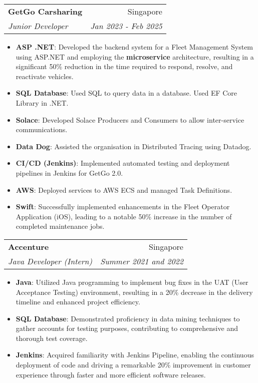 \documentclass[letterpaper,11pt]{article}
\makeatletter
\newcommand{\resumeItem}[2]{
  \item\small{
    \textbf{#1}{: #2 \vspace{-2pt}}
  }
}
\newcommand{\resumeSubheading}[4]{
  \vspace{-1pt}\item
    \begin{tabular*}{0.97\textwidth}[t]{l@{\extracolsep{\fill}}r}
      \textbf{#1} & #2 \\
      \textit{\small#3} & \textit{\small #4} \\
    \end{tabular*}\vspace{-5pt}
}
\newcommand{\resumeSubSubheading}[2]{
    \begin{tabular*}{0.97\textwidth}{l@{\extracolsep{\fill}}r}
      \textit{\small#1} & \textit{\small #2} \\
    \end{tabular*}\vspace{-5pt}
}
\newcommand{\resumeSubHeadingListEnd}{\end{itemize}}
\newcommand{\resumeItemListStart}{\begin{itemize}}
\newcommand{\resumeItemListEnd}{\end{itemize}\vspace{-5pt}}
\makeatother
\begin{document}
    \resumeSubheading
      {GetGo Carsharing}{Singapore}
      {Junior Developer}{Jan 2023 - Feb 2025}
      \resumeItemListStart
          \resumeItem{ASP .NET}
          {Developed the backend system for a Fleet Management System using ASP.NET and employing the \textbf{microservice}
          architecture, resulting in a significant 50\% reduction in the time required to respond, resolve, and reactivate vehicles.}
          \resumeItem{SQL Database}
          {Used SQL to query data in a database. Used EF Core Library in .NET.}
          \resumeItem{Solace}
          {Developed Solace Producers and Consumers to allow inter-service communications. }
          \resumeItem{Data Dog}
          {Assisted the organisation in Distributed Tracing using Datadog. }
          \resumeItem{CI/CD (Jenkins)}
          {Implemented automated testing and deployment pipelines in Jenkins for GetGo 2.0.}
          \resumeItem{AWS}
          {Deployed services to AWS ECS and managed Task Definitions. }
          \resumeItem{Swift}
            {Successfully implemented enhancements in the Fleet Operator Application (iOS), leading to a notable 50\% increase in
            the number of completed maintenance jobs.}
      \resumeItemListEnd
      

    \resumeSubheading
      {Accenture}{Singapore}
      {Java Developer (Intern)}{Summer 2021 and 2022}
      \resumeItemListStart
        \resumeItem{Java}
          {Utilized Java programming to implement bug fixes in the UAT (User Acceptance Testing) environment, resulting in a
          20\% decrease in the delivery timeline and enhanced project efficiency.}
        \resumeItem{SQL Database}
          {Demonstrated proficiency in data mining techniques to gather accounts for testing purposes, contributing to
          comprehensive and thorough test coverage.}
         \resumeItem{Jenkins}
          {Acquired familiarity with Jenkins Pipeline, enabling the continuous deployment of code and driving a remarkable 20\%
          improvement in customer experience through faster and more efficient software releases.}
      \resumeItemListEnd
\end{document}
